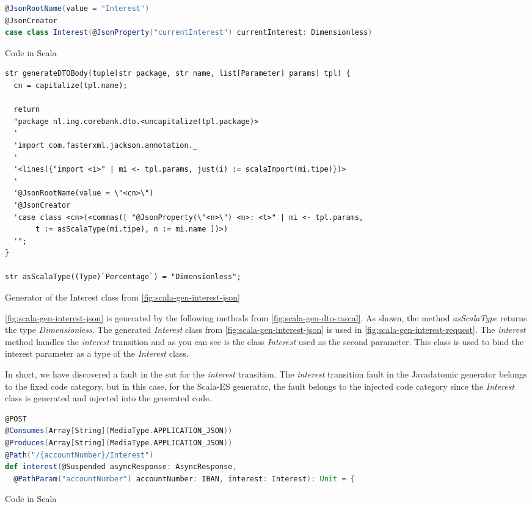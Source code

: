 \begin{sourcecode}[h!]
\begin{lstlisting}[language=scala]
@JsonRootName(value = "Interest")
@JsonCreator
case class Interest(@JsonProperty("currentInterest") currentInterest: Dimensionless)
\end{lstlisting}
\caption{Code in Scala}\label{fig:scala-gen-interest-json}
\end{sourcecode}
\FloatBarrier

\begin{sourcecode}[h!]
\begin{lstlisting}[]
str generateDTOBody(tuple[str package, str name, list[Parameter] params] tpl) {
  cn = capitalize(tpl.name);

  return
  "package nl.ing.corebank.dto.<uncapitalize(tpl.package)>
  '
  'import com.fasterxml.jackson.annotation._
  '
  '<lines({"import <i>" | mi <- tpl.params, just(i) := scalaImport(mi.tipe)})>
  '
  '@JsonRootName(value = \"<cn>\")
  '@JsonCreator
  'case class <cn>(<commas([ "@JsonProperty(\"<n>\") <n>: <t>" | mi <- tpl.params,
	   t := asScalaType(mi.tipe), n := mi.name ])>)
  '";
}

str asScalaType((Type)`Percentage`) = "Dimensionless";
\end{lstlisting}
\caption{Generator of the Interest class from \autoref{fig:scala-gen-interest-json}}\label{fig:scala-gen-dto-rascal}
\end{sourcecode}
\FloatBarrier

\autoref{fig:scala-gen-interest-json} is generated by the following methods
from \autoref{fig:scala-gen-dto-rascal}. As shown, the method
\textit{asScalaType} returns the type \textit{Dimensionless}.
The generated \textit{Interest} class from \autoref{fig:scala-gen-interest-json}
is used in \autoref{fig:scala-gen-interest-request}. The \textit{interest}
method handles the \textit{interest} transition and as you can see is the class
\textit{Interest} used as the second parameter. This class is used to bind the
interest parameter as a type of the \textit{Interest} class.

In short, we have discovered a fault in the \gls{sut}
for the \textit{interest} transition. The \textit{interest} transition fault in
the Javadatomic generator belongs to the fixed code category, but in this case,
for the Scala-ES generator, the fault belongs to the injected code category
since the \textit{Interest} class is generated and injected into the generated
code.

\begin{sourcecode}[h!]
\begin{lstlisting}[language=scala]
@POST
@Consumes(Array[String](MediaType.APPLICATION_JSON))
@Produces(Array[String](MediaType.APPLICATION_JSON))
@Path("/{accountNumber}/Interest")
def interest(@Suspended asyncResponse: AsyncResponse,
  @PathParam("accountNumber") accountNumber: IBAN, interest: Interest): Unit = {
\end{lstlisting}
\caption{Code in Scala}\label{fig:scala-gen-interest-request}
\end{sourcecode}
\FloatBarrier

